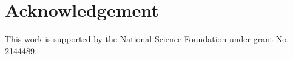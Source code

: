 \section{Acknowledgement}

This work is supported by the National Science Foundation under grant No. 2144489.

